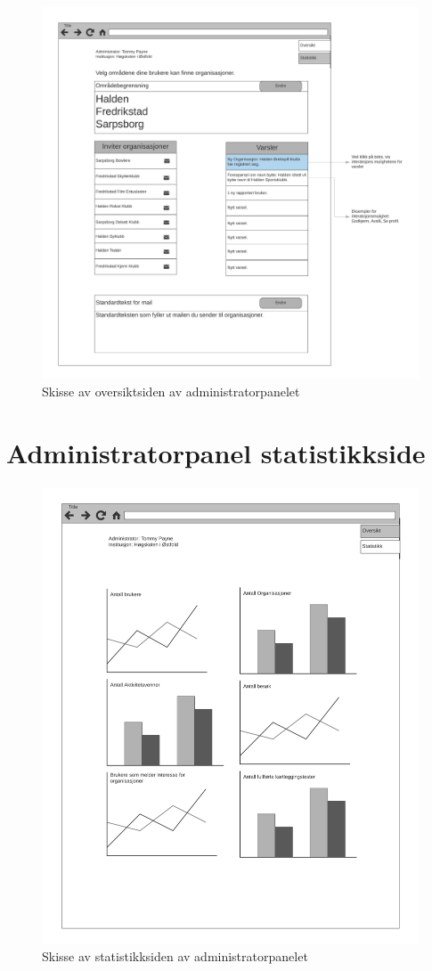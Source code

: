 \begin{figure}[H]
\centering
\includegraphics[width=\textwidth]{Illustrasjoner/Skisser/2.0/2-15-admin-oversikt.png}
\caption{Skisse av oversiktsiden av administratorpanelet}
\label{vedlegg:2-15-admin-oversikt}
\end{figure}

\section{Administratorpanel statistikkside}

\begin{figure}[H]
\centering
\includegraphics[width=\textwidth]{Illustrasjoner/Skisser/2.0/2-16-admin-statistikk.png}
\caption{Skisse av statistikksiden av administratorpanelet}
\label{vedlegg:2-16-admin-statistikk}
\end{figure}